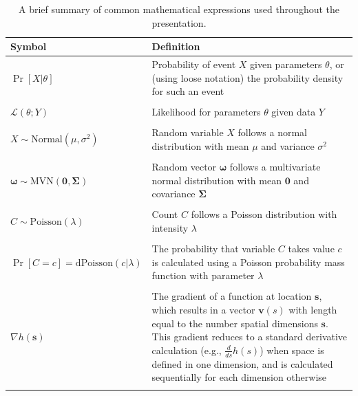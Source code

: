 \begin{table}
  \caption[Notation for commonly used expressions]{A brief summary of common mathematical expressions used throughout the presentation.}
\begin{center}
\begin{tabularx}{\textwidth}{ | X m{4in} | } 
  \hline
  Symbol & Definition \\ 
  \hline
  \( \Pr[X | \theta ]\) & Probability of event \(X\) given parameters \(\theta\), or (using loose notation) the probability density for such an event \\ & \\ 

  \( \mathcal{L}( \theta; Y ) \) & Likelihood for parameters \(\theta\) given data \(Y\) \\ & \\

  \( X \sim \mathrm{Normal}(\mu,\sigma^2) \) & Random variable \(X\) follows a normal distribution with mean \(\mu\) and variance \( \sigma^2 \) \\ & \\

  \( \mathbf{\omega} \sim \mathrm{MVN}(\mathbf{0},\mathbf{\Sigma}) \) & Random vector \( \mathbf{\omega} \) follows a multivariate normal distribution with mean \( \mathbf{0} \) and covariance \( \mathbf{\Sigma} \) \\ & \\

  \( C \sim \mathrm{Poisson}( \lambda ) \) & Count \(C\) follows a Poisson distribution with intensity \( \lambda \) \\ & \\

  \( \Pr[C=c] = \mathrm{dPoisson}( c | \lambda ) \) & The probability that variable \(C\) takes value \(c\) is calculated using a Poisson probability mass function with parameter \( \lambda \) \\ & \\
  
  \( \nabla h(\mathbf{s}) \) & The gradient of a function at location \(\mathbf{s}\), which results in a vector \(\mathbf{v}(s)\) with length equal to the number spatial dimensions \(\mathbf{s}\).  This gradient reduces to a standard derivative calculation (e.g., \( \frac{d}{ds} h(s) \)) when space is defined in one dimension, and is calculated sequentially for each dimension otherwise \\ & \\


\end{tabularx}
\end{center}
\end{table}

